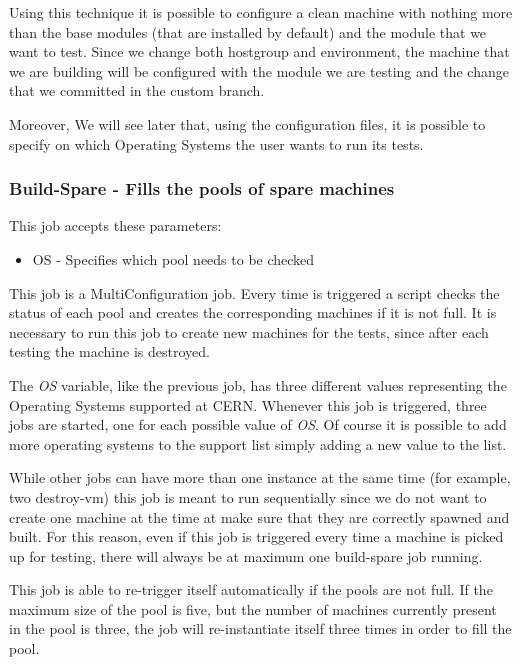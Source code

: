Using this technique it is possible to configure a clean machine with
nothing more than the base modules (that are installed by default) and the
module that we want to test. Since we change both hostgroup and
environment, the machine that we are building will be configured with the
module we are testing and the change that we committed in the custom
branch.

Moreover, We will see later that, using the configuration files, it is
possible to specify on which Operating Systems the user wants to run its
tests.

\subsubsection{Build-Spare - Fills the pools of spare machines}

This job accepts these parameters:

\begin{itemize}
  \item OS - Specifies which pool needs to be checked
\end{itemize}

This job is a MultiConfiguration job. Every time is triggered a script
checks the status of each pool and creates the corresponding machines if
it is not full. It is necessary to run this job to create new machines for
the tests, since after each testing the machine is destroyed.

The \textit{OS} variable, like the previous job, has three different
values representing the Operating Systems supported at CERN. Whenever this
job is triggered, three jobs are started, one for each possible value of
\textit{OS}. Of course it is possible to add more operating systems to the
support list simply adding a new value to the list.

While other jobs can have more than one instance at the same time (for
example, two destroy-vm) this job is meant to run sequentially since we do
not want to create one machine at the time at make sure that they are
correctly spawned and built. For this reason, even if this job is
triggered every time a machine is picked up for testing, there will always
be at maximum one build-spare job running.

This job is able to re-trigger itself automatically if the pools are not
full. If the maximum size of the pool is five, but the number of machines
currently present in the pool is three, the job will re-instantiate itself
three times in order to fill the pool.

